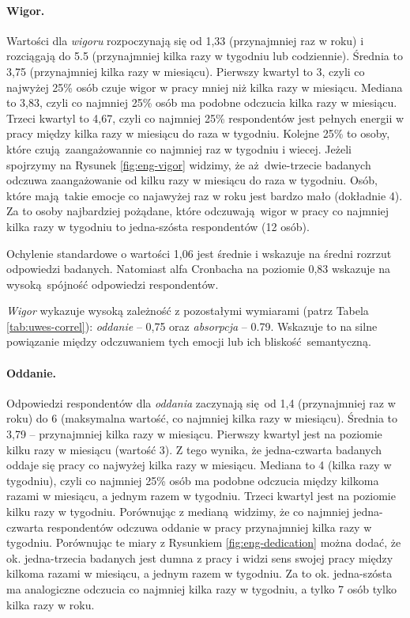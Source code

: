 \paragraph{Wigor.} Wartości dla \textit{wigoru} rozpoczynają się od 1,33 (przynajmniej raz w roku) i rozciągają do 5.5 (przynajmniej kilka razy w tygodniu lub codziennie). Średnia to 3,75 (przynajmniej kilka razy w miesiącu). Pierwszy kwartyl to 3, czyli co najwyżej 25\% osób czuje wigor w pracy mniej niż kilka razy w miesiącu. Mediana to 3,83, czyli co najmniej 25\% osób ma podobne odczucia kilka razy w miesiącu. Trzeci kwartyl to 4,67, czyli co najmniej 25\%
respondentów jest pełnych energii w pracy między kilka razy w miesiącu do raza w tygodniu. Kolejne 25\% to osoby, które czują zaangażowannie co najmniej raz w tygodniu i wiecej. Jeżeli spojrzymy na Rysunek \ref{fig:eng-vigor} widzimy, że aż dwie-trzecie badanych odczuwa zaangażowanie od kilku razy w miesiącu do raza w tygodniu. Osób, które mają takie emocje co najawyżej raz w roku jest bardzo mało (dokładnie 4). Za to osoby najbardziej pożądane, które odczuwają wigor w pracy co najmniej
kilka razy w tygodniu to jedna-szósta respondentów (12 osób).

Ochylenie standardowe o wartości 1,06 jest średnie i wskazuje na średni rozrzut odpowiedzi badanych. Natomiast alfa Cronbacha na poziomie 0,83 wskazuje na wysoką spójność odpowiedzi respondentów.

\textit{Wigor} wykazuje wysoką zależność z pozostałymi wymiarami (patrz Tabela \ref{tab:uwes-correl}): \textit{oddanie} -- 0,75 oraz \textit{absorpcja} -- 0.79. Wskazuje to na silne powiązanie między odczuwaniem tych emocji lub ich bliskość semantyczną.

\paragraph{Oddanie.} Odpowiedzi respondentów dla \textit{oddania} zaczynają się od 1,4 (przynajmniej raz w roku) do 6 (maksymalna wartość, co najmniej kilka razy w miesiącu). Średnia to 3,79 -- przynajmniej kilka razy w miesiącu. Pierwszy kwartyl jest na poziomie kilku razy w miesiącu (wartość 3). Z tego wynika, że jedna-czwarta badanych oddaje się pracy co najwyżej kilka razy w miesiącu. Mediana to 4 (kilka razy w tygodniu), czyli co najmniej 25\% osób ma podobne odczucia
między kilkoma razami w miesiącu, a jednym razem w tygodniu. Trzeci kwartyl jest na poziomie kilku razy w tygodniu. Porównując z medianą widzimy, że co najmniej jedna-czwarta respondentów odczuwa oddanie w pracy przynajmniej kilka razy w tygodniu. Porównując te miary z Rysunkiem \ref{fig:eng-dedication} można dodać, że ok. jedna-trzecia badanych jest dumna z pracy i widzi sens swojej pracy między kilkoma razami w miesiącu, a jednym razem w tygodniu. Za to ok.
jedna-szósta ma analogiczne odczucia co najmniej kilka razy w tygodniu, a tylko 7 osób tylko kilka razy w roku.


